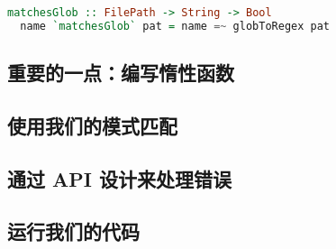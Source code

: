 \documentclass[./main.tex]{subfiles}
\begin{document}
\begin{lstlisting}[language=Haskell]
  matchesGlob :: FilePath -> String -> Bool
  name `matchesGlob` pat = name =~ globToRegex pat
\end{lstlisting}

\subsection*{重要的一点：编写惰性函数}

\subsection*{使用我们的模式匹配}

\subsection*{通过 API 设计来处理错误}

\subsection*{运行我们的代码}
\end{document}
